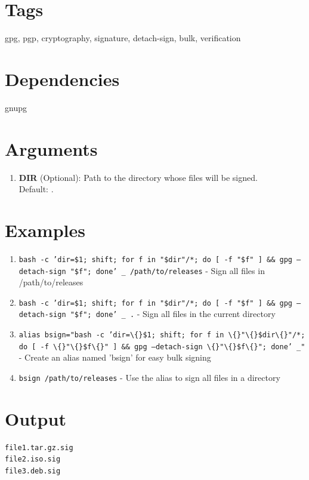 \documentclass[openany]{book}
\begin{document}
\section*{Tags}
gpg, pgp, cryptography, signature, detach-sign, bulk, verification

\section*{Dependencies}
gnupg


\section*{Arguments}
\begin{enumerate}
  \item \textbf{DIR} (Optional): Path to the directory whose files will be signed. \\ Default: .
\end{enumerate}

\section*{Examples}
\begin{enumerate}
  \item \texttt{bash -c 'dir=\$1; shift; for f in "\$dir"/*; do [ -f "\$f" ] \&\& gpg --detach-sign "\$f"; done' \_ /path/to/releases} - Sign all files in /path/to/releases
  \item \texttt{bash -c 'dir=\$1; shift; for f in "\$dir"/*; do [ -f "\$f" ] \&\& gpg --detach-sign "\$f"; done' \_ .} - Sign all files in the current directory
  \item \texttt{alias bsign="bash -c 'dir=\textbackslash\{\}\$1; shift; for f in \textbackslash\{\}"\textbackslash\{\}\$dir\textbackslash\{\}"/*; do [ -f \textbackslash\{\}"\textbackslash\{\}\$f\textbackslash\{\}" ] \&\& gpg --detach-sign \textbackslash\{\}"\textbackslash\{\}\$f\textbackslash\{\}"; done' \_"} - Create an alias named 'bsign' for easy bulk signing
  \item \texttt{bsign /path/to/releases} - Use the alias to sign all files in a directory
\end{enumerate}

\section*{Output}
\begin{lstlisting}
file1.tar.gz.sig
file2.iso.sig
file3.deb.sig
\end{lstlisting}
\end{document}
